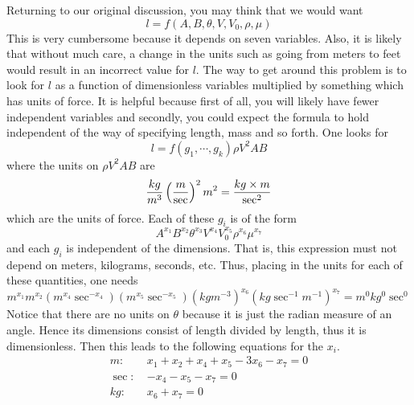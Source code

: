 Returning to our original discussion, you may think that we would want 
\begin{equation*}
l=f\left( A,B,\theta ,V,V_{0},\rho ,\mu \right) 
\end{equation*}
This is very cumbersome because it depends on seven variables. Also, it is likely that without much care,
a change in the units such as going from meters to feet would result in an
incorrect value for $l$. The way to get around this problem is to look for $l
$ as a function of dimensionless variables multiplied by something which has
units of force. It is helpful because first of all, you will likely have
fewer independent variables and secondly, you could expect the formula to
hold independent of the way of specifying length, mass and so forth. One
looks for 
\begin{equation*}
l=f\left( g_{1},\cdots ,g_{k}\right) \rho V^{2}AB
\end{equation*}
where the units on $\rho V^{2}AB$ are 
\begin{equation*}
\frac{kg}{m^{3}}\left( \frac{m}{\sec }\right) ^{2}m^{2}=\frac{kg\times m}{%
\sec ^{2}}
\end{equation*}
which are the units of force. Each of these $g_{i}$ is of the form 
\begin{equation}
A^{x_{1}}B^{x_{2}}\theta ^{x_{3}}V^{x_{4}}V_{0}^{x_{5}}\rho ^{x_{6}}\mu
^{x_{7}}  \label{11julye1f}
\end{equation}
and each $g_{i}$ is independent of the dimensions. That is, this expression
must not depend on meters, kilograms, seconds, etc. Thus, placing in the
units for each of these quantities, one needs 
\begin{equation*}
m^{x_{1}}m^{x_{2}}\left( m^{x_{4}}\sec ^{-x_{4}}\right) \left( m^{x_{5}}\sec
^{-x_{5}}\right) \left( kgm^{-3}\right) ^{x_{6}}\left( kg\sec
^{-1}m^{-1}\right) ^{x_{7}}=m^{0}kg^{0}\sec ^{0}
\end{equation*}
Notice that there are no units on $\theta $ because it is just the radian
measure of an angle. Hence its dimensions consist of length divided by
length, thus it is dimensionless. Then this leads to the following equations
for the $x_{i}.$
\begin{equation*}
\begin{array}{cc}
m: & x_{1}+x_{2}+x_{4}+x_{5}-3x_{6}-x_{7}=0 \\ 
\sec :\  & -x_{4}-x_{5}-x_{7}=0 \\ 
kg: & x_{6}+x_{7}=0%
\end{array}
\end{equation*}
